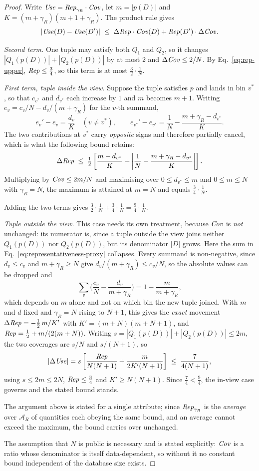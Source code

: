 \begin{proof}
Write $\mathit{Use}=\mathit{Rep}_{\gamma_R}\cdot\mathit{Cov}$, let $m=|p(D)|$ and $K=(m+\gamma_R)(m+1+\gamma_R)$.
The product rule gives
\begin{equation}
|\mathit{Use}(D)-\mathit{Use}(D')| \;\le\; \Delta\mathit{Rep}\cdot\mathit{Cov}(D) + \mathit{Rep}(D')\cdot\Delta\mathit{Cov} .
\label{eq:usefulness-product-rule}
\end{equation}

\emph{Second term.} One tuple may satisfy both $Q_1$ and $Q_2$, so it changes $|Q_1(p(D))|+|Q_2(p(D))|$ by at most $2$ and $\Delta\mathit{Cov}\le 2/N$.
By Eq.~\eqref{eq:rep-upper}, $\mathit{Rep}\le\tfrac34$, so this term is at most $\tfrac32\cdot\tfrac1N$.

\emph{First term, tuple inside the view.} Suppose the tuple satisfies $p$ and lands in bin $v^*$, so that $c_{v^*}$ and $d_{v^*}$ each increase by $1$ and $m$ becomes $m+1$.
Writing $e_v=c_v/N-d_v/(m+\gamma_R)$ for the $v$-th summand,
\[
e_v'-e_v=\frac{d_v}{K}\quad(v\ne v^*),
\qquad
e_{v^*}'-e_{v^*}=\frac1N-\frac{m+\gamma_R-d_{v^*}}{K}.
\]
The two contributions at $v^*$ carry \emph{opposite} signs and therefore partially cancel, which is what the following bound retains:
\[
\Delta\mathit{Rep}\;\le\;\tfrac12\left[\frac{m-d_{v^*}}{K}+\left|\frac1N-\frac{m+\gamma_R-d_{v^*}}{K}\right|\right].
\]
Multiplying by $\mathit{Cov}\le 2m/N$ and maximising over $0\le d_{v^*}\le m$ and $0\le m\le N$ with $\gamma_R=N$, the maximum is attained at $m=N$ and equals $\tfrac34\cdot\tfrac1N$.

Adding the two terms gives $\tfrac32\cdot\tfrac1N+\tfrac34\cdot\tfrac1N=\tfrac94\cdot\tfrac1N$.

\emph{Tuple outside the view.} This case needs its own treatment, because $\mathit{Cov}$ is \emph{not} unchanged: its numerator is, since a tuple outside the view joins neither $Q_1(p(D))$ nor $Q_2(p(D))$, but its denominator $|D|$ grows.
Here the sum in Eq.~\eqref{eq:representativeness-proxy} collapses.
Every summand is non-negative, since $d_v\le c_v$ and $m+\gamma_R\ge N$ give $d_v/(m+\gamma_R)\le c_v/N$, so the absolute values can be dropped and
\[
\sum_v\Big(\frac{c_v}{N}-\frac{d_v}{m+\gamma_R}\Big)=1-\frac{m}{m+\gamma_R},
\]
which depends on $m$ alone and not on which bin the new tuple joined.
With $m$ and $d$ fixed and $\gamma_R=N$ rising to $N+1$, this gives the \emph{exact} movement $\Delta\mathit{Rep}=-\tfrac12\,m/K'$ with $K'=(m+N)(m+N+1)$, and $\mathit{Rep}=\tfrac12+m/(2(m+N))$.
Writing $s=|Q_1(p(D))|+|Q_2(p(D))|\le 2m$, the two coverages are $s/N$ and $s/(N+1)$, so
\[
|\Delta\mathit{Use}| = s\left[\frac{\mathit{Rep}}{N(N+1)}+\frac{m}{2K'(N+1)}\right]
\;\le\;\frac{7}{4(N+1)},
\]
using $s\le2m\le2N$, $\mathit{Rep}\le\tfrac34$ and $K'\ge N(N+1)$.
Since $\tfrac74<\tfrac94$, the in-view case governs and the stated bound stands.

The argument above is stated for a single attribute; since $\mathit{Rep}_{\gamma_R}$ is the \emph{average} over $\mathcal{A}_R$ of quantities each obeying the same bound, and an average cannot exceed the maximum, the bound carries over unchanged.

The assumption that $N$ is public is necessary and is stated explicitly: $\mathit{Cov}$ is a ratio whose denominator is itself data-dependent, so without it no constant bound independent of the database size exists.
\end{proof}

